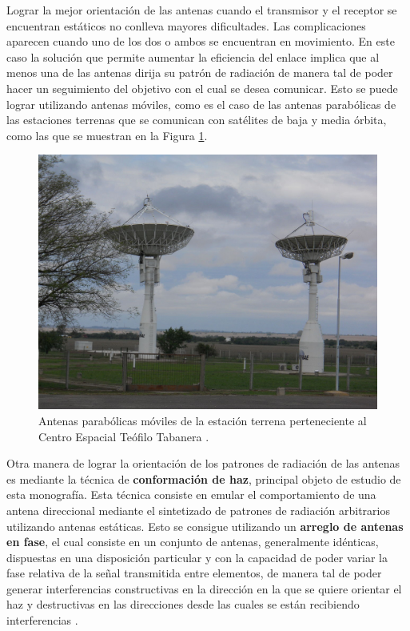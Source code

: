 Lograr la mejor orientación de las antenas cuando el transmisor y el receptor se encuentran estáticos no conlleva mayores dificultades. Las complicaciones aparecen cuando uno de los dos o ambos se encuentran en movimiento. En este caso la solución que permite aumentar la eficiencia del enlace implica que al menos una de las antenas dirija su patrón de radiación de manera tal de poder hacer un seguimiento del objetivo con el cual se desea comunicar. Esto se puede lograr utilizando antenas móviles, como es el caso de las antenas parabólicas de las estaciones terrenas que se comunican con satélites de baja y media órbita, como las que se muestran en la Figura \ref{fig:beamforming_cordoba}.

\begin{figure}[ht]
    \centering
    \includegraphics[width=1\linewidth]{images/02-Beamforming/estacionterrenacordoba.jpg}
    \caption{Antenas parabólicas móviles de la estación terrena perteneciente al Centro Espacial Teófilo Tabanera \cite{bib:estacionterrena_cordoba}.}
    \label{fig:beamforming_cordoba}
\end{figure}


Otra manera de lograr la orientación de los patrones de radiación de las antenas es mediante la técnica de \textbf{conformación de haz}, principal objeto de estudio de esta monografía. Esta técnica consiste en emular el comportamiento de una antena direccional mediante el sintetizado de patrones de radiación arbitrarios utilizando antenas estáticas. Esto se consigue utilizando un \textbf{arreglo de antenas en fase}, el cual consiste en un conjunto de antenas, generalmente idénticas, dispuestas en una disposición particular y con la capacidad de poder variar la fase relativa de la señal transmitida entre elementos, de manera tal de poder generar interferencias constructivas en la dirección en la que se quiere orientar el haz y destructivas en las direcciones desde las cuales se están recibiendo interferencias \cite{bib:Balanis_p303}.

